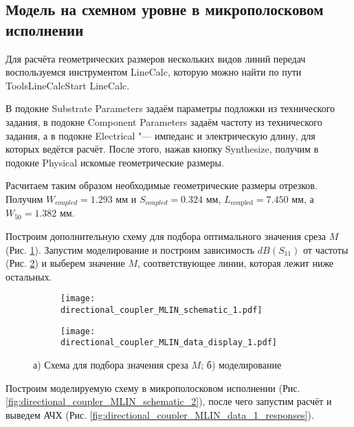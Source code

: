 \subsection{Модель на схемном уровне в микрополосковом исполнении}

Для расчёта геометрических размеров нескольких видов линий передач воспользуемся инструментом LineCalc, которую можно найти по пути Tools\textrightarrow LineCalc\textrightarrow Start LineCalc.

В подокне Substrate Parameters задаём параметры подложки из технического задания, в подокне Component Parameters задаём частоту из технического задания, а в подокне Electrical "--- импеданс и электрическую длину, для которых ведётся расчёт.
После этого, нажав кнопку Synthesize, получим в подокне Physical искомые геометрические размеры.

Расчитаем таким образом необходимые геометрические размеры отрезков.
Получим $W_{coupled} = 1.293 \text{~мм}$ и $S_{coupled} = 0.324 \text{~мм}$, $L_\text{coupled} = 7.450 \text{~мм}$, а $W_{50} = 1.382 \text{~мм}$.

Построим дополнительную схему для подбора оптимального значения среза $M$ (Рис. \ref{fig:directional_coupler_MLIN_schematic_1}). Запустим моделирование и построим зависимость $dB(S_{11})$ от частоты (Рис. \ref{fig:directional_coupler_MLIN_data_display_1}) и выберем значение $M$, соответствующее линии, которая лежит ниже остальных.

\begin{figure}[!ht]
    \centering
    \begin{subfigure}[b]{0.50\textwidth}
        \centering
        \texttt{[image: directional\_coupler\_MLIN\_schematic\_1.pdf]}
        \caption{}
        \label{fig:directional_coupler_MLIN_schematic_1}
    \end{subfigure}
    \hfill
    \begin{subfigure}[b]{0.40\textwidth}
        \centering
        \texttt{[image: directional\_coupler\_MLIN\_data\_display\_1.pdf]}
        \caption{}
        \label{fig:directional_coupler_MLIN_data_display_1}
    \end{subfigure}
    \caption{
        а) Схема для подбора значения среза $M$;
        б) моделирование
    }
    \label{fig:directional_coupler_MLIN_miter}
\end{figure}

Построим моделируемую схему в микрополосковом исполнении (Рис. \ref{fig:directional_coupler_MLIN_schematic_2}), после чего запустим расчёт и выведем АЧХ (Рис. \ref{fig:directional_coupler_MLIN_data_1_responses}).

